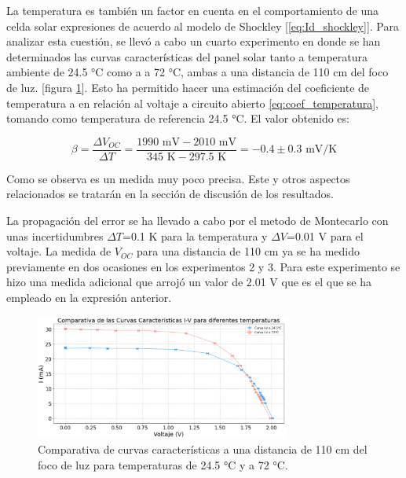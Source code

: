 \vspace{\baselineskip}

La temperatura es también un factor en cuenta en el comportamiento de una celda solar expresiones de acuerdo al modelo de Shockley [\ref{eq:Id_shockley}]. Para analizar esta cuestión, se llevó  a cabo un cuarto experimento en donde se han determinados las curvas características del panel solar tanto a temperatura ambiente de 24.5 °C como a  a 72 °C, ambas a una distancia de 110 cm del foco de luz. [figura \ref{fig:I_V_temperatura}].  Esto ha permitido hacer una estimación del coeficiente de temperatura a en relación al voltaje a circuito abierto \ref{eq:coef_temperatura}, tomando como temperatura de referencia 24.5 °C. El valor obtenido es:

\vspace{\baselineskip}

\begin{equation}\label{eq:beta_VT}
	\beta= \frac{\Delta V_{OC}}{\Delta T} = \frac{1990 \text{ mV} - 2010 \text{ mV} }{345 \text{ K}  - 297.5 \text{ K} } = -0.4\pm 0.3 \text{ mV/K} 
\end{equation}

\vspace{\baselineskip}

Como se observa es un medida muy poco precisa. Este y otros aspectos relacionados se tratarán en la sección de discusión de los resultados.


\vspace{\baselineskip}

La propagación del error se ha llevado a cabo por el metodo de Montecarlo con unas incertidumbres $\Delta T$=0.1 K para la temperatura y $\Delta V$=0.01 V para el voltaje. La medida de $V_{OC}$ para una distancia de 110 cm ya se ha medido previamente en dos ocasiones en los experimentos 2 y 3. Para este experimento se hizo una medida adicional que arrojó un valor de 2.01 V que es el que se ha empleado en la expresión anterior. 

\vspace{\baselineskip}


\begin{figure}[H]
	\centering
	\includegraphics[width=0.75\textwidth]{grafico06_I_V_temperatura.png}
	\caption{Comparativa de curvas características a una distancia de 110 cm del foco de luz para temperaturas de 24.5 °C y a 72 °C.}
	\label{fig:I_V_temperatura}
\end{figure}


